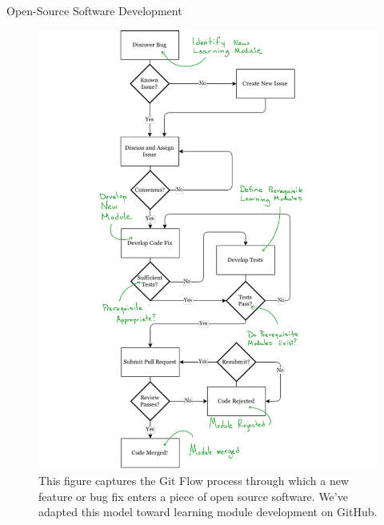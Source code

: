 \documentclass[final]{beamer}
\newlength{\onecolwid}
\newlength{\threecolwid}
\begin{document}
\begin{frame}[t]
\begin{columns}[t,totalwidth=\threecolwid]
\begin{column}{\onecolwid} %


\begin{block} {Open-Source Software Development}
          \begin{figure}
            \hspace*{-3.5cm}
              \includegraphics[clip, trim=3cm 0cm 4cm 
                                      0cm, width=1.15\linewidth]{git-flow.pdf}
        \caption{This figure captures the Git Flow process through which a new
                          feature or bug fix enters a piece of open source
                          software. We've adapted this model toward learning 
                          module development on GitHub.}
                                  \label{fig:sub1}

\end{figure}
\end{block}
\end{column}
\end{columns}
\end{frame}
\end{document}
